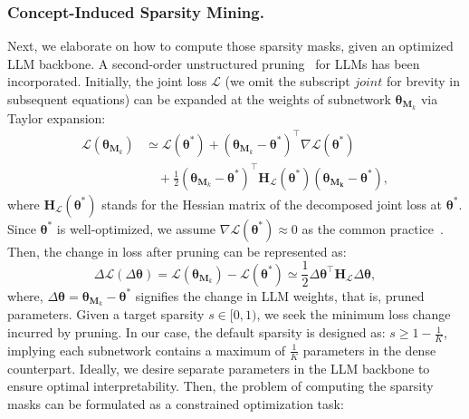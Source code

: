 \documentclass[letterpaper]{article} %
\begin{document}
\subsubsection{Concept-Induced Sparsity Mining.}
Next, we elaborate on how to compute those sparsity masks, given an optimized LLM backbone. A second-order unstructured pruning~\cite{hassibi1992second,kurtic2022optimal} for LLMs has been incorporated. Initially, the joint loss $\mathcal{L}$ (we omit the subscript $joint$ for brevity in subsequent equations) can be expanded at the weights of subnetwork $\bm{\theta}_{\bm{M}_k}$ via Taylor expansion:
\begin{equation}
\begin{aligned}
    \mathcal{L}(\bm{\theta}_{\bm{M}_k}) &\simeq \mathcal{L}(\bm{\theta}^\ast) + (\bm{\theta}_{\bm{M}_k} - \bm{\theta}^\ast)^{\top} \nabla \mathcal{L}(\bm{\theta}^\ast) \\& \quad+ \frac{1}{2}(\bm{\theta}_{\bm{M}_k}-\bm{\theta}^\ast)^\top \bm{H}_{\mathcal{L}} (\bm{\theta}^\ast)(\bm{\theta_{\bm{M}_k}} - \bm{\theta}^\ast),
\end{aligned}
\end{equation}
where $\bm{H}_{\mathcal{L}}(\bm{\theta}^\ast)$ stands for the Hessian matrix of the decomposed joint loss at $\bm{\theta}^\ast$. Since $\bm{\theta}^\ast$ is well-optimized, we assume $\nabla \mathcal{L} (\bm{\theta}^\ast) \approx 0$ as the common practice~\cite{hassibi1992second,kurtic2022optimal}. Then, the change in loss after pruning can be represented as:
\begin{equation}
    \Delta \mathcal{L} (\Delta\bm\theta) = \mathcal{L}(\bm{\theta}_{\bm{M}_k}) - \mathcal{L} (\bm\theta^\ast) \simeq \frac{1}{2}\Delta\bm\theta^\top \bm{H}_\mathcal{L} \Delta \bm{\theta},
\end{equation}
where, $\Delta\bm{\theta} = \bm\theta_{\bm{M}_k}-\bm{\theta}^\ast$ signifies the change in LLM weights, that is, pruned parameters. Given a target sparsity $s\in [0,1)$, we seek the minimum loss change incurred by pruning. In our case, the default sparsity is designed as: $s \geq 1-\frac{1}{K}$, implying each subnetwork contains a maximum of $\frac{1}{K}$ parameters in the dense counterpart. Ideally, we desire separate parameters in the LLM backbone to ensure optimal interpretability. Then, the problem of computing the sparsity masks can be formulated as a constrained optimization task:
\end{document}
